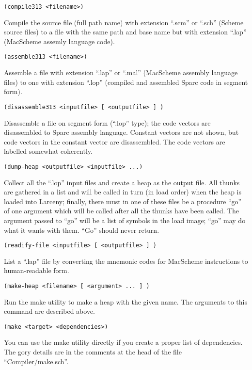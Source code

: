 \begin{description}
\item {\verb+(compile313 <filename>)+}

Compile the source file (full path name) with extension ``.scm'' or
``.sch'' (Scheme source files) to a file with the same path and base
name but with extension ``.lap'' (MacScheme assemly language code).

\item {\verb+(assemble313 <filename>)+}

Assemble a file with extension ``.lap'' or ``.mal'' (MacScheme assembly
language files) to one with extension ``.lop'' (compiled and assembled
Sparc code in segment form).

\item {\verb+(disassemble313 <inputfile> [ <outputfile> ] )+}

Disassemble a file on segment form (``.lop'' type); the code vectors are
disassembled to Sparc assembly language. Constant vectors are not shown,
but code vectors in the constant vector are disassembled. The code vectors
are labelled somewhat coherently.

\item {\verb+(dump-heap <outputfile> <inputfile> ...)+}

Collect all the ``.lop'' input files and create a heap as the output file.
All thunks are gathered in a list and will be called in turn (in load order)
when the heap is loaded into Larceny; finally, there must in one of these
files be a procedure ``go'' of one argument which will be called after all
the thunks have been called. The argument passed to ``go'' will be a list
of symbols in the load image; ``go'' may do what it wants with them.
``Go'' should never return.

\item {\verb+(readify-file <inputfile> [ <outputfile> ] )+}

List a ``.lap'' file by converting the mnemonic codes for MacScheme 
instructions to human-readable form.

\item {\verb+(make-heap <filename> [ <argument> ... ] )+}

Run the make utility to make a heap with the given name. The arguments to
this command are described above.

\item {\verb+(make <target> <dependencies>)+}

You can use the make utility directly if you create a proper list of
dependencies. The gory details are in the comments at the head of the file
``Compiler/make.sch''.

\end{description}

